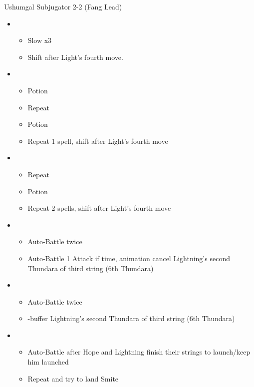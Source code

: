 	\begin{battle}[2:21]{Ushumgal Subjugator 2-2 (Fang Lead)}
		\begin{itemize}
			\item \third
			      \begin{itemize}
				      \item Slow x3
				      \item Shift after Light's fourth move.
			      \end{itemize}
			\item \fifth
			      \begin{itemize}
				      \item Potion
				      \item Repeat
				      \item Potion
				      \item Repeat 1 spell, shift after Light's fourth move
			      \end{itemize}
			\item \third
			      \begin{itemize}
				      \item Repeat
				      \item Potion
				      \item Repeat 2 spells, shift after Light's fourth move
			      \end{itemize}
			\item \second
			      \begin{itemize}
				      \item Auto-Battle twice
				      \item Auto-Battle 1 Attack if time, animation cancel Lightning's second Thundara of third string (6th Thundara)
			      \end{itemize}
			\item \sixth
			      \begin{itemize}
				      \item Auto-Battle twice
				      \item \com-buffer Lightning's second Thundara of third string (6th Thundara)
			      \end{itemize}
			\item \first
			      \begin{itemize}
				      \item Auto-Battle after Hope and Lightning finish their strings to launch/keep him launched
				      \item Repeat and try to land Smite
			      \end{itemize}

\end{itemize}
\end{battle}
